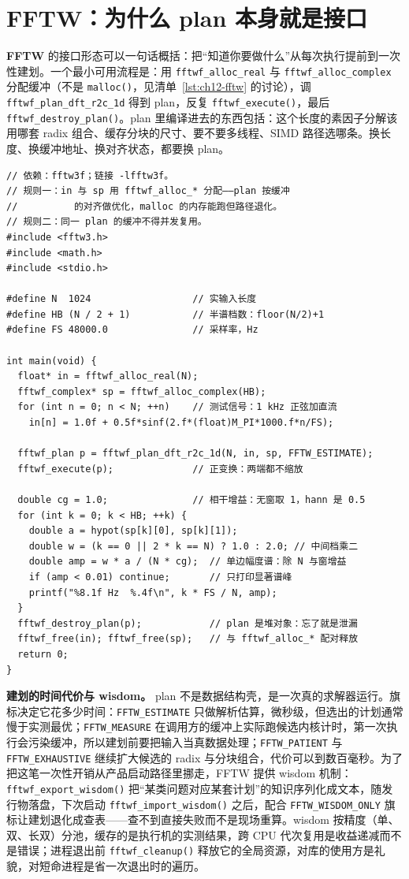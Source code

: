\documentclass[12pt,a4paper,fontset=fandol]{ctexbook}
\newcommand{\Fn}[1]{\texttt{#1()}}
\newcommand{\Tp}[1]{\texttt{#1}}
\newcommand{\Bk}{\allowbreak}
\newcommand{\Lib}[1]{\textbf{#1}}
\begin{document}
\section{\Lib{FFTW}：为什么 plan 本身就是接口}

\Lib{FFTW} 的接口形态可以一句话概括：把``知道你要做什么''从每次执行提前到一次性建划。一个最小可用流程是：用 \Tp{fftwf\Bk\_alloc\Bk\_real} 与 \Tp{fftwf\Bk\_alloc\Bk\_complex} 分配缓冲（不是 \Fn{malloc}，见清单~\ref{lst:ch12-fftw} 的讨论），调 \Tp{fftwf\Bk\_plan\Bk\_dft\Bk\_r2c\Bk\_1d} 得到 plan，反复 \Fn{fftwf\_execute}，最后 \Fn{fftwf\_destroy\_plan}。plan 里编译进去的东西包括：这个长度的素因子分解该用哪套 radix 组合、缓存分块的尺寸、要不要多线程、SIMD 路径选哪条。换长度、换缓冲地址、换对齐状态，都要换 plan。

\begin{lstlisting}[style=cstyle,label={lst:ch12-fftw},caption={FFTW：r2c 单边幅度谱，plan 与缓冲的同生关系}]
// 依赖：fftw3f；链接 -lfftw3f。
// 规则一：in 与 sp 用 fftwf_alloc_* 分配——plan 按缓冲
//          的对齐做优化，malloc 的内存能跑但路径退化。
// 规则二：同一 plan 的缓冲不得并发复用。
#include <fftw3.h>
#include <math.h>
#include <stdio.h>

#define N  1024                  // 实输入长度
#define HB (N / 2 + 1)           // 半谱档数：floor(N/2)+1
#define FS 48000.0               // 采样率，Hz

int main(void) {
  float* in = fftwf_alloc_real(N);
  fftwf_complex* sp = fftwf_alloc_complex(HB);
  for (int n = 0; n < N; ++n)    // 测试信号：1 kHz 正弦加直流
    in[n] = 1.0f + 0.5f*sinf(2.f*(float)M_PI*1000.f*n/FS);

  fftwf_plan p = fftwf_plan_dft_r2c_1d(N, in, sp, FFTW_ESTIMATE);
  fftwf_execute(p);              // 正变换：两端都不缩放

  double cg = 1.0;               // 相干增益：无窗取 1，hann 是 0.5
  for (int k = 0; k < HB; ++k) {
    double a = hypot(sp[k][0], sp[k][1]);
    double w = (k == 0 || 2 * k == N) ? 1.0 : 2.0; // 中间档乘二
    double amp = w * a / (N * cg);  // 单边幅度谱：除 N 与窗增益
    if (amp < 0.01) continue;       // 只打印显著谱峰
    printf("%8.1f Hz  %.4f\n", k * FS / N, amp);
  }
  fftwf_destroy_plan(p);            // plan 是堆对象：忘了就是泄漏
  fftwf_free(in); fftwf_free(sp);   // 与 fftwf_alloc_* 配对释放
  return 0;
}
\end{lstlisting}

\textbf{建划的时间代价与 wisdom。} plan 不是数据结构壳，是一次真的求解器运行。旗标决定它花多少时间：\Tp{FFTW\_ESTIMATE} 只做解析估算，微秒级，但选出的计划通常慢于实测最优；\Tp{FFTW\_MEASURE} 在调用方的缓冲上实际跑候选内核计时，第一次执行会污染缓冲，所以建划前要把输入当真数据处理；\Tp{FFTW\_PATIENT} 与 \Tp{FFTW\_EXHAUSTIVE} 继续扩大候选的 radix 与分块组合，代价可以到数百毫秒。为了把这笔一次性开销从产品启动路径里挪走，FFTW 提供 wisdom 机制：\Fn{fftwf\_export\_wisdom} 把``某类问题对应某套计划''的知识序列化成文本，随发行物落盘，下次启动 \Fn{fftwf\_import\_wisdom} 之后，配合 \Tp{FFTW\_WISDOM\_ONLY} 旗标让建划退化成查表——查不到直接失败而不是现场重算。wisdom 按精度（单、双、长双）分池，缓存的是执行机的实测结果，跨 CPU 代次复用是收益递减而不是错误；进程退出前 \Fn{fftwf\_cleanup} 释放它的全局资源，对库的使用方是礼貌，对短命进程是省一次退出时的遍历。
\end{document}
